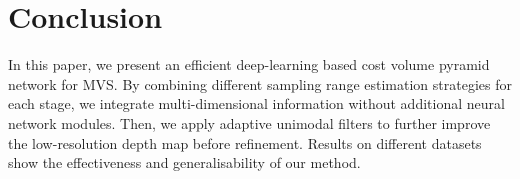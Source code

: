 \documentclass{article}
\begin{document}
\section{Conclusion}
In this paper, we present an efficient deep-learning based cost volume pyramid network for MVS.
By combining different sampling range estimation strategies for each stage, we integrate multi-dimensional information without additional neural network modules.
Then, we apply adaptive unimodal filters to further improve the low-resolution depth map before refinement.
Results on different datasets show the effectiveness and generalisability of our method.






  
\end{document}
